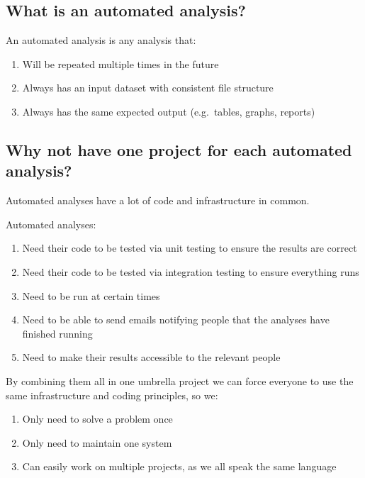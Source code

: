 \documentclass[12pt,]{article}
\providecommand{\tightlist}{%
  \setlength{\itemsep}{0pt}\setlength{\parskip}{0pt}}
\theoremstyle{definition}
\theoremstyle{definition}
\theoremstyle{definition}
\theoremstyle{remark}
\begin{document}
\subsection{What is an automated
analysis?}\label{what-is-an-automated-analysis}

An automated analysis is any analysis that:

\begin{enumerate}
\def\labelenumi{\arabic{enumi}.}
\tightlist
\item
  Will be repeated multiple times in the future
\item
  Always has an input dataset with consistent file structure
\item
  Always has the same expected output (e.g.~tables, graphs, reports)
\end{enumerate}

\subsection{Why not have one project for each automated
analysis?}\label{why-not-have-one-project-for-each-automated-analysis}

Automated analyses have a lot of code and infrastructure in common.

Automated analyses:

\begin{enumerate}
\def\labelenumi{\arabic{enumi}.}
\tightlist
\item
  Need their code to be tested via unit testing to ensure the results
  are correct
\item
  Need their code to be tested via integration testing to ensure
  everything runs
\item
  Need to be run at certain times
\item
  Need to be able to send emails notifying people that the analyses have
  finished running
\item
  Need to make their results accessible to the relevant people
\end{enumerate}

By combining them all in one umbrella project we can force everyone to
use the same infrastructure and coding principles, so we:

\begin{enumerate}
\def\labelenumi{\arabic{enumi}.}
\tightlist
\item
  Only need to solve a problem once
\item
  Only need to maintain one system
\item
  Can easily work on multiple projects, as we all speak the same
  language
\end{enumerate}
\end{document}
